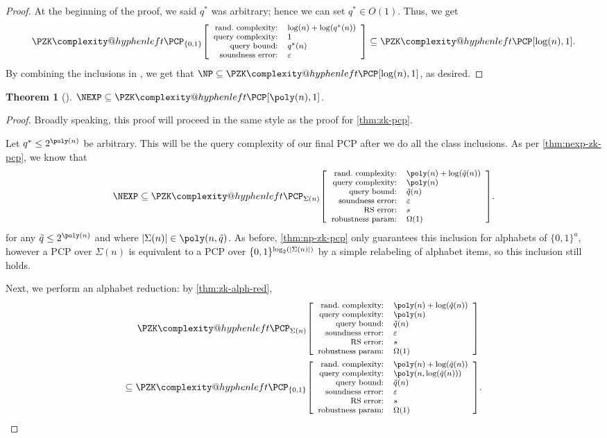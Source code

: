 \documentclass[english,12pt]{reedthesis}
\makeatletter
\theoremstyle{plain}
\newtheorem{thm}{Theorem}[section]
\theoremstyle{definition}
\theoremstyle{remark}
\DeclarePairedDelimiter{\abs}{\lvert}{\rvert}
\newcommand{\pzkpcp}[4]{%
  \ensuremath%
  \mleft[{\footnotesize\begin{array}{r l}
    \text{rand.\ complexity:} & #1 \\
    \text{query complexity:} & #2 \\
    \text{query bound:} & #3 \\
    \text{soundness error:} & #4
  \end{array}}\mright]%
}
\newcommand{\pzkpcpr}[6]{%
  \ensuremath%
  \mleft[{\footnotesize\begin{array}{r l}
    \text{rand.\ complexity:} & #1 \\
    \text{query complexity:} & #2 \\
    \text{query bound:} & #3 \\
    \text{soundness error:} & #4 \\
    \text{RS error:} & #5 \\
    \text{robustness param:} & #6
  \end{array}}\mright]%
}
\newcommand{\PZKPCP}{%
  \PZK\complexity@hyphenleft\PCP
}
\makeatother
\begin{document}
\begin{proof}
  At the beginning of the proof, we said $q^{*}$ was arbitrary; hence we can set
  $q^{*} \in O(1)$. Thus, we get
  \begin{equation}\label{eqn:qstar-arbitrary-np}
      \PZKPCP_{\{0,1\}}\pzkpcp{\log(n)+\log(q^{*}(n))}{1}{q^{*}(n)}{\varepsilon} \subseteq \PZKPCP[\log(n), 1].
  \end{equation}
  By combining the inclusions in
  , we get that
  $\NP \subseteq \PZKPCP[\log(n), 1]$, as desired.
\end{proof}

\begin{thm}[{\cite[Theorem 7.1]{GOS25}}]\label{thm:zk-pcp-nexp}
  $\NEXP \subseteq \PZKPCP[\poly(n), 1]$.
\end{thm}

\begin{proof}
  Broadly speaking, this proof will proceed in the same style as the proof for
  \cref{thm:zk-pcp}. %

  Let $q^{*} \le 2^{\poly(n)}$ be arbitrary. This will be the query complexity of
  our final PCP after we do all the class inclusions. As per
  \cref{thm:nexp-zk-pcp}, we know that
  \begin{equation}\label{eqn:nexp-subseteq-pzkpcp}
    \NEXP \subseteq \PZKPCP_{\Sigma(n)}\pzkpcpr{\poly(n)+\log(\tilde{q}(n))}{\poly(n)}{\tilde{q}(n)}{\varepsilon}{s}{\Omega(1)}.
  \end{equation}
  for any $\tilde{q} \le 2^{\poly(n)}$ and where
  $\abs{\Sigma(n)} \in \poly(n, \tilde{q})$. As before, \cref{thm:np-zk-pcp} only
  guarantees this inclusion for alphabets of $\{0, 1\}^{a}$, however a PCP over
  $\Sigma(n)$ is equivalent to a PCP over $\{0, 1\}^{\log_{2}(\abs{\Sigma(n)})}$ by a
  simple relabeling of alphabet items, so this inclusion still holds.

  Next, we perform an alphabet reduction: by \cref{thm:zk-alph-red},
  \begin{equation}\label{eqn:alph-red-nexp}
    \begin{aligned}
      \PZKPCP_{\Sigma(n)}&\pzkpcpr{\poly(n)+\log(\tilde{q}(n))}{\poly(n)}{\tilde{q}(n)}{\varepsilon}{s}{\Omega(1)} \\
      \subseteq \PZKPCP_{\{0,1\}}&\pzkpcpr{\poly(n)+\log(\tilde{q}(n))}{\poly(n,\log(\tilde{q}(n)))}{\tilde{q}(n)}{\varepsilon}{s}{\Omega(1)}.
    \end{aligned}
  \end{equation}


\end{proof}
\end{document}

